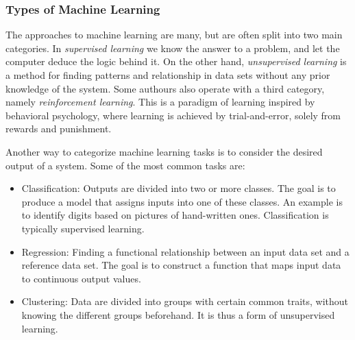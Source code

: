 \documentclass{beamer}
\begin{document}
\begin{frame}
\frametitle{Types of Machine Learning}

The approaches to machine learning are many, but are often split into
two main categories.  In \emph{supervised learning} we know the answer to a
problem, and let the computer deduce the logic behind it. On the other
hand, \emph{unsupervised learning} is a method for finding patterns and
relationship in data sets without any prior knowledge of the system.
Some authours also operate with a third category, namely
\emph{reinforcement learning}. This is a paradigm of learning inspired by
behavioral psychology, where learning is achieved by trial-and-error,
solely from rewards and punishment.

Another way to categorize machine learning tasks is to consider the
desired output of a system.  Some of the most common tasks are:

\begin{itemize}
  \item Classification: Outputs are divided into two or more classes. The goal is to   produce a model that assigns inputs into one of these classes. An example is to identify  digits based on pictures of hand-written ones. Classification is typically supervised learning.

  \item Regression: Finding a functional relationship between an input data set and a reference data set.   The goal is to construct a function that maps input data to continuous output values.

  \item Clustering: Data are divided into groups with certain common traits, without knowing the different groups beforehand.  It is thus a form of unsupervised learning.
\end{itemize}

\noindent
\end{frame}
\end{document}

